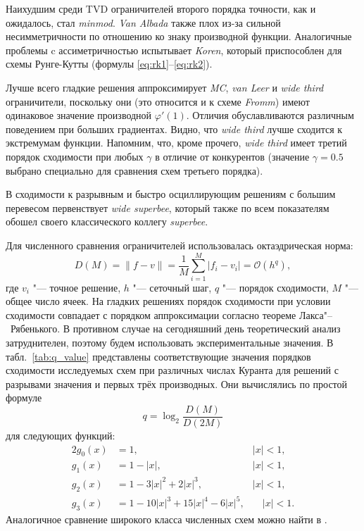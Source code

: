 \documentclass[a4paper,10pt]{article}
\begin{document}
Наихудшим среди TVD ограничителей второго порядка точности, как и ожидалось, стал \textit{minmod}.
\textit{Van Albada} также плох из-за сильной несимметричности по отношению ко знаку производной функции.
Аналогичные проблемы c ассиметричностью испытывает \textit{Koren}, который приспособлен для схемы Рунге-Кутты (формулы \ref{eq:rk1}--\ref{eq:rk2}).

Лучше всего гладкие решения аппроксимирует \textit{MC}, \textit{van Leer} и \textit{wide third} ограничители,
поскольку они (это относится и к схеме \textit{Fromm}) имеют одинаковое значение производной \(\varphi'(1)\).
Отличия обуславливаются различным поведением при больших градиентах.
Видно, что \textit{wide third} лучше сходится к экстремумам функции.
Напомним, что, кроме прочего, \textit{wide third} имеет третий порядок сходимости при любых \(\gamma\) в отличие от конкурентов
(значение \(\gamma=0.5\) выбрано специально для сравнения схем третьего порядка).

В сходимости к разрывным и быстро осциллирующим решениям с большим перевесом первенствует \textit{wide superbee},
который также по всем показателям обошел своего классического коллегу \textit{superbee}.

Для численного сравнения ограничителей использовалась октаэдрическая норма:
\begin{equation}\label{eq:norm}
	D(M) = \|f-v\| = \frac1{M}\sum_{i=1}^{M}|f_i-v_i| = \mathcal{O}(h^q),
\end{equation}
где \(v_i\) "--- точное решение, \(h\) "--- сеточный шаг, \(q\) "--- порядок сходимости, \(M\) "--- общее число ячеек.
На гладких решениях порядок сходимости при условии сходимости совпадает с порядком аппроксимации согласно теореме Лакса"--~Рябенького.
В противном случае на сегодняшний день теоретический анализ затруднителен, поэтому будем использовать экспериментальные значения.
В табл.~\ref{tab:q_value} представлены соответствующие значения порядков сходимости исследуемых схем при различных числах Куранта
для решений с разрывами значения и первых трёх производных. Они вычислялись по простой формуле
\[ q = \log_2\frac{D(M)}{D(2M)} \]
для следующих функций:
\begin{alignat*}{2}
	 g_0(x) &= 1,\quad &|x| < 1, \\
	 g_1(x) &= 1-|x|,\quad &|x| < 1, \\
	 g_2(x) &= 1-3|x|^2+2|x|^3,\quad &|x| < 1, \\
	 g_3(x) &= 1-10|x|^3+15|x|^4-6|x|^5,&\quad |x| < 1.
\end{alignat*}
Аналогичное сравнение широкого класса численных схем можно найти в \cite{Safronov2010}.
\end{document}
